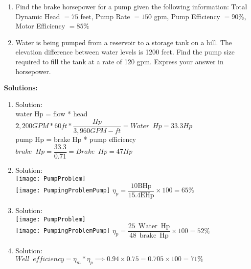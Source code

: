 \begin{enumerate}
  \item Find the brake horsepower for a pump given the following information: Total Dynamic Head $=75$ feet, Pump Rate $=150$ gpm, Pump Efficiency $=90 \%$, Motor Efficiency $=85 \%$

  \item Water is being pumped from a reservoir to a storage tank on a hill. The elevation difference between water levels is 1200 feet. Find the pump size required to fill the tank at a rate of 120 gpm. Express your answer in horsepower.

\end{enumerate}


\textbf{Solutions:}

\begin{enumerate}

\item  Solution:\\
\vspace{0.4cm}
water Hp = flow * head\\
$2,200GPM*60ft*\dfrac{Hp}{3,960 GPM-ft}=\boxed{Water \enspace Hp = 33.3Hp}$\\
\vspace{0.4cm}
pump Hp = brake Hp * pump efficiency\\
$brake \enspace Hp = \dfrac{33.3}{0.71}=\boxed{Brake \enspace Hp=47Hp}$
 \vspace{0.2cm}

 \item Solution:\\ 
 \vspace{0.2cm}
 \vspace{0.4cm}\texttt{[image: PumpProblem]}\\
 \vspace{0.2cm}
 \texttt{[image: PumpingProblemPump]}
 $\eta_p=\dfrac{10 \mathrm{BHp}}{15.4 \mathrm{EHp}} \times 100=\boxed{65 \%}$
 \vspace{0.2cm}
 
 
 \item Solution:\\
  \vspace{0.2cm}
 \vspace{0.32cm}\texttt{[image: PumpProblem]}\\
 \vspace{0.2cm}
 \texttt{[image: PumpingProblemPump]}
 \vspace{0.2cm}
$\eta_p=\dfrac{25 \mathrm{\enspace Water \enspace Hp}}{48 \mathrm{\enspace brake \enspace Hp}} \times 100=\boxed{52 \%}$
  \vspace{0.4cm}
 \item Solution:\\ 
 \vspace{0.2cm}
$Well \enspace efficiency=\eta_m * \eta_p \implies 0.94 \times 0.75=0.705 \times 100=\boxed{71 \%}$
 \vspace{0.2cm}



\end{enumerate}
